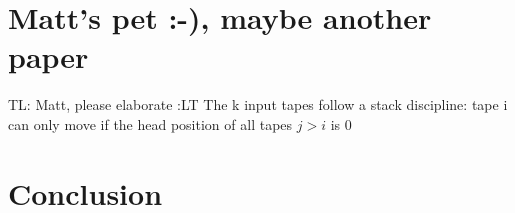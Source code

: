 \documentclass{llncs}
\newcommand{\tl}[1]{\color{blue} {TL: #1 :LT} \color{black}}
\newcommand{\tl}[1]{}
\begin{document}
\section{Matt's pet :-), maybe another paper}

\begin{definition} 
	\tl{Matt, please elaborate}
	The
	k input tapes follow a stack discipline: tape i can only move if the
	head position of all tapes $j > i$ is 0 
\end{definition}


\section{Conclusion}
\end{document}
